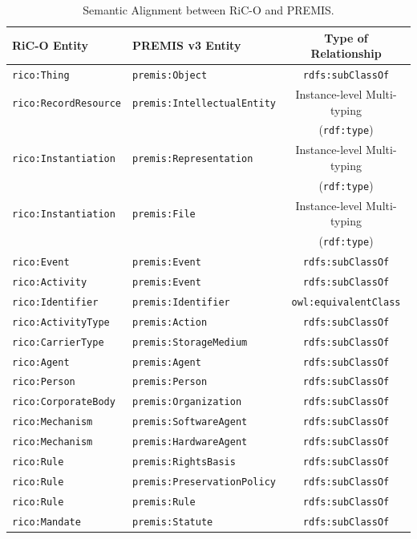 \documentclass[runningheads]{llncs}
\begin{document}
\begin{table}[ht]
	\begin{center}
		\footnotesize
		\begin{tabular}{l  l  c}
			\hline\hline
			\textbf{RiC-O Entity} & \textbf{PREMIS v3 Entity} & \textbf{Type of Relationship} \\
			\hline\hline
			\texttt{rico:Thing} & 	\texttt{premis:Object} & 	\texttt{rdfs:subClassOf} \\\hline
			\texttt{rico:RecordResource} & \texttt{premis:IntellectualEntity} & Instance-level Multi-typing\\
			&  & (\texttt{rdf:type}) \\
			\hline
			\texttt{rico:Instantiation} & \texttt{premis:Representation} & Instance-level Multi-typing\\
			&  & (\texttt{rdf:type}) \\\hline
			\texttt{rico:Instantiation} & \texttt{premis:File} & Instance-level Multi-typing\\
			&  & (\texttt{rdf:type}) \\\hline
			\texttt{rico:Event} & \texttt{premis:Event} & \texttt{rdfs:subClassOf} \\\hline
			\texttt{rico:Activity} & \texttt{premis:Event} & \texttt{rdfs:subClassOf} \\\hline
			\texttt{rico:Identifier} & \texttt{premis:Identifier} & \texttt{owl:equivalentClass} \\\hline
			\texttt{rico:ActivityType} & \texttt{premis:Action} & \texttt{rdfs:subClassOf} \\\hline
			\texttt{rico:CarrierType} & \texttt{premis:StorageMedium} & \texttt{rdfs:subClassOf} \\\hline
			\texttt{rico:Agent} & \texttt{premis:Agent} & \texttt{rdfs:subClassOf} \\\hline
			\texttt{rico:Person} & \texttt{premis:Person} & \texttt{rdfs:subClassOf} \\\hline
			\texttt{rico:CorporateBody} & \texttt{premis:Organization} & \texttt{rdfs:subClassOf} \\\hline
			\texttt{rico:Mechanism} & \texttt{premis:SoftwareAgent} & \texttt{rdfs:subClassOf} \\\hline
			\texttt{rico:Mechanism} & \texttt{premis:HardwareAgent} & \texttt{rdfs:subClassOf} \\\hline
			\texttt{rico:Rule} & \texttt{premis:RightsBasis} & \texttt{rdfs:subClassOf} \\\hline
			\texttt{rico:Rule} & \texttt{premis:PreservationPolicy} & \texttt{rdfs:subClassOf} \\\hline
			\texttt{rico:Rule} & \texttt{premis:Rule} & \texttt{rdfs:subClassOf} \\\hline
			\texttt{rico:Mandate} & \texttt{premis:Statute} & \texttt{rdfs:subClassOf} \\\hline
			\hline
		\end{tabular}
	\end{center}
	\caption{Semantic Alignment between RiC-O and PREMIS.}
	\label{tab:rico-premis-mapping}
\end{table}
\end{document}
